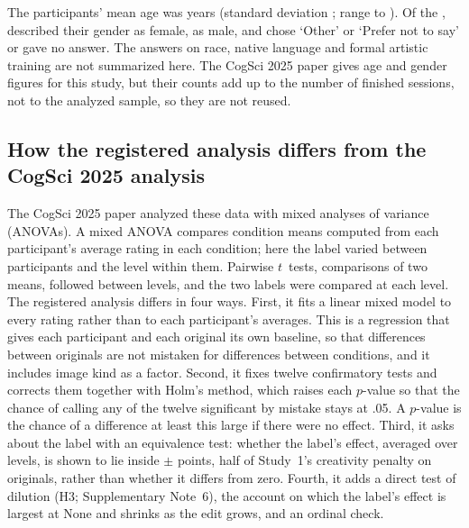 The participants' mean age was \STwoAgeMean{} years (standard deviation \STwoAgeSD; range \STwoAgeMin{} to \STwoAgeMax). Of the \STwoN, \STwoNWomen{} described their gender as female, \STwoNMen{} as male, and \STwoNGenderOther{} chose `Other' or `Prefer not to say' or gave no answer. The answers on race, native language and formal artistic training are not summarized here. The CogSci 2025 paper gives age and gender figures for this study, but their counts add up to the number of finished sessions, not to the analyzed sample, so they are not reused.

\subsection*{How the registered analysis differs from the CogSci 2025 analysis}

The CogSci 2025 paper analyzed these data with mixed analyses of variance (ANOVAs). A mixed ANOVA compares condition means computed from each participant's average rating in each condition; here the label varied between participants and the level within them. Pairwise $t$~tests, comparisons of two means, followed between levels, and the two labels were compared at each level. The registered analysis differs in four ways. First, it fits a linear mixed model to every rating rather than to each participant's averages. This is a regression that gives each participant and each original its own baseline, so that differences between originals are not mistaken for differences between conditions, and it includes image kind as a factor. Second, it fixes twelve confirmatory tests and corrects them together with Holm's method, which raises each $p$-value so that the chance of calling any of the twelve significant by mistake stays at .05. A $p$-value is the chance of a difference at least this large if there were no effect. Third, it asks about the label with an equivalence test: whether the label's effect, averaged over levels, is shown to lie inside $\pm$\SourceBound{} points, half of Study~1's creativity penalty on originals, rather than whether it differs from zero. Fourth, it adds a direct test of dilution (H3; Supplementary Note~6), the account on which the label's effect is largest at None and shrinks as the edit grows, and an ordinal check.

